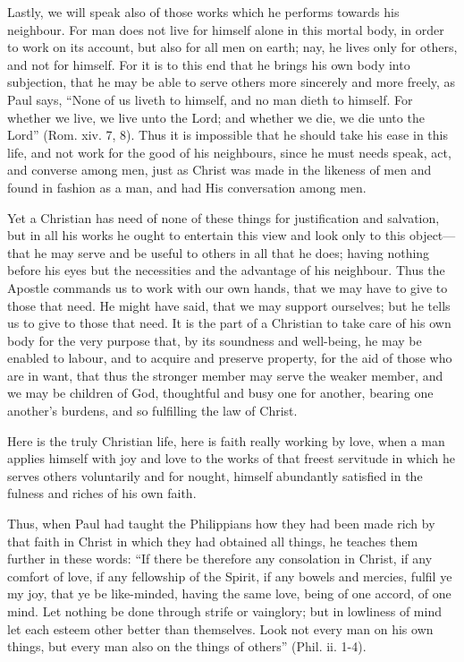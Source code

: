Lastly, we will speak also of those works which he performs towards his
neighbour. For man does not live for himself alone in this mortal body, in
order to work on its account, but also for all men on earth; nay, he lives
only for others, and not for himself. For it is to this end that he brings
his own body into subjection, that he may be able to serve others more
sincerely and more freely, as Paul says, ``None of us liveth to himself,
and no man dieth to himself. For whether we live, we live unto the Lord;
and whether we die, we die unto the Lord'' (Rom. xiv. 7, 8). Thus it is
impossible that he should take his ease in this life, and not work for the
good of his neighbours, since he must needs speak, act, and converse among
men, just as Christ was made in the likeness of men and found in fashion
as a man, and had His conversation among men.

Yet a Christian has need of none of these things for justification and
salvation, but in all his works he ought to entertain this view and look
only to this object—that he may serve and be useful to others in all
that he does; having nothing before his eyes but the necessities and the
advantage of his neighbour. Thus the Apostle commands us to work with our
own hands, that we may have to give to those that need. He might have
said, that we may support ourselves; but he tells us to give to those that
need. It is the part of a Christian to take care of his own body for the
very purpose that, by its soundness and well-being, he may be enabled to
labour, and to acquire and preserve property, for the aid of those who are
in want, that thus the stronger member may serve the weaker member, and we
may be children of God, thoughtful and busy one for another, bearing one
another's burdens, and so fulfilling the law of Christ.

Here is the truly Christian life, here is faith really working by love,
when a man applies himself with joy and love to the works of that freest
servitude in which he serves others voluntarily and for nought, himself
abundantly satisfied in the fulness and riches of his own faith.

Thus, when Paul had taught the Philippians how they had been made rich by
that faith in Christ in which they had obtained all things, he teaches
them further in these words: ``If there be therefore any consolation in
Christ, if any comfort of love, if any fellowship of the Spirit, if any
bowels and mercies, fulfil ye my joy, that ye be like-minded, having the
same love, being of one accord, of one mind. Let nothing be done through
strife or vainglory; but in lowliness of mind let each esteem other better
than themselves. Look not every man on his own things, but every man also
on the things of others'' (Phil. ii. 1-4).

